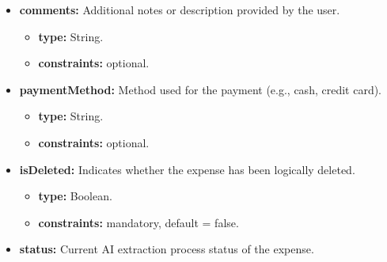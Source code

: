 \begin{itemize} [leftmargin=0.75cm, noitemsep, label=\textbullet]
    \begin{itemize} [leftmargin=0.75cm, noitemsep, label=$\circ$]

        \item \textbf{type:} String.

        \item \textbf{constraints:} mandatory, non-null.

    \end{itemize}

    \item \textbf{comments:} Additional notes or description provided by the user.
    
    \begin{itemize} [leftmargin=0.75cm, noitemsep, label=$\circ$]

        \item \textbf{type:} String.

        \item \textbf{constraints:} optional.

    \end{itemize}

    \item \textbf{paymentMethod:} Method used for the payment (e.g., cash, credit card).
    
    \begin{itemize} [leftmargin=0.75cm, noitemsep, label=$\circ$]

        \item \textbf{type:} String.

        \item \textbf{constraints:} optional.

    \end{itemize}

    \item \textbf{isDeleted:} Indicates whether the expense has been logically deleted.
    
    \begin{itemize} [leftmargin=0.75cm, noitemsep, label=$\circ$]

        \item \textbf{type:} Boolean.

        \item \textbf{constraints:} mandatory, default = false.

    \end{itemize} 

    \item \textbf{status:} Current AI extraction process status of the expense.
    

\end{itemize}
